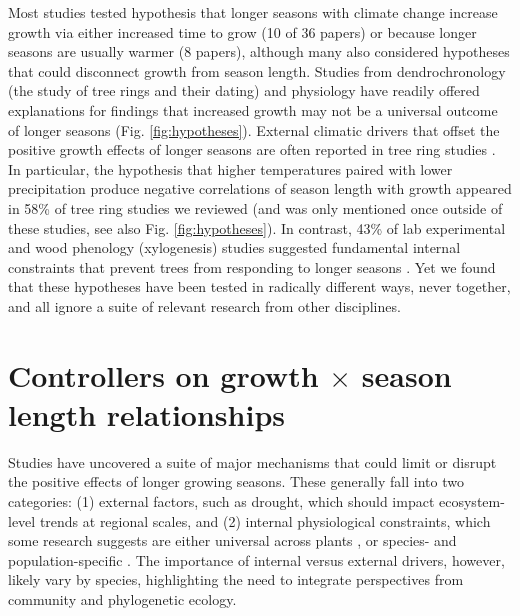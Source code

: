 \documentclass[11pt]{article}
\begin{document}
Most studies tested hypothesis that longer seasons with climate change increase growth via either increased time to grow (10 of 36 papers) or because longer seasons are usually warmer (8 papers), although many also considered hypotheses that could disconnect growth from season length. Studies from dendrochronology (the study of tree rings and their dating) and physiology have readily offered explanations for findings that increased growth may not be a universal outcome of longer seasons (Fig. \ref{fig:hypotheses}). External climatic drivers that offset the positive growth effects of longer seasons are often reported in tree ring studies \citep{kolavr2016response,de2022temperature,camarero2022decoupled}. In particular, the hypothesis that higher temperatures paired with lower precipitation produce negative correlations of season length with growth appeared in 58\% of tree ring studies we reviewed (and was only mentioned once outside of these studies, see also Fig. \ref{fig:hypotheses}). In contrast, 43\% of lab experimental and wood phenology (xylogenesis) studies suggested fundamental internal constraints that prevent trees from responding to longer seasons \citep[Fig. \ref{fig:heatmapssupp},][]{cuny2012life,michelot2012comparing,zohner2023effect}. Yet we found that these hypotheses have been tested in radically different ways, never together, and all ignore a suite of relevant research from other disciplines. %
 
\section*{Controllers on growth $\times$ season length relationships}

Studies have uncovered a suite of major mechanisms that could limit or disrupt the positive effects of longer growing seasons. These generally fall into two categories: (1) external factors, such as drought, which should impact ecosystem-level trends at regional scales, and (2) internal physiological constraints, which some research suggests are either universal across plants \citep[e.g.][]{zohner2023effect}, or species- and population-specific \citep[e.g.][]{soolanayakanahally2013timing}. The importance of internal versus external drivers, however, likely vary by species, highlighting the need to integrate perspectives from community and phylogenetic ecology. 
\end{document}
